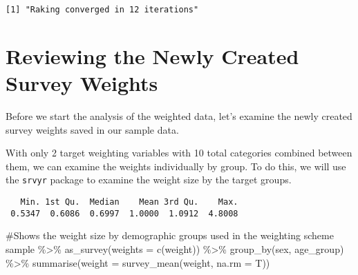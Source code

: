 \documentclass[
  letterpaper,
  DIV=11,
  numbers=noendperiod]{scrreprt}
\newenvironment{Shaded}{\begin{snugshade}}{\end{snugshade}}
\newcommand{\AttributeTok}[1]{\textcolor[rgb]{0.40,0.45,0.13}{#1}}
\newcommand{\CommentTok}[1]{\textcolor[rgb]{0.37,0.37,0.37}{#1}}
\newcommand{\DecValTok}[1]{\textcolor[rgb]{0.68,0.00,0.00}{#1}}
\newcommand{\FunctionTok}[1]{\textcolor[rgb]{0.28,0.35,0.67}{#1}}
\newcommand{\NormalTok}[1]{\textcolor[rgb]{0.00,0.23,0.31}{#1}}
\newcommand{\OtherTok}[1]{\textcolor[rgb]{0.00,0.23,0.31}{#1}}
\newcommand{\SpecialCharTok}[1]{\textcolor[rgb]{0.37,0.37,0.37}{#1}}
\begin{document}
\begin{verbatim}
[1] "Raking converged in 12 iterations"
\end{verbatim}

\begin{Shaded}
\end{Shaded}

\hypertarget{reviewing-the-newly-created-survey-weights}{%
\section{Reviewing the Newly Created Survey
Weights}\label{reviewing-the-newly-created-survey-weights}}

Before we start the analysis of the weighted data, let's examine the
newly created survey weights saved in our sample data.

With only 2 target weighting variables with 10 total categories combined
between them, we can examine the weights individually by group. To do
this, we will use the \texttt{srvyr} package to examine the weight size
by the target groups.

\begin{Shaded}
\end{Shaded}

\begin{verbatim}
   Min. 1st Qu.  Median    Mean 3rd Qu.    Max. 
 0.5347  0.6086  0.6997  1.0000  1.0912  4.8008 
\end{verbatim}

\begin{Shaded}
\begin{Highlighting}[]
\CommentTok{\#Shows the weight size by demographic groups used in the weighting scheme}
\NormalTok{sample }\SpecialCharTok{\%\textgreater{}\%} 
  \FunctionTok{as\_survey}\NormalTok{(}\AttributeTok{weights =} \FunctionTok{c}\NormalTok{(weight)) }\SpecialCharTok{\%\textgreater{}\%}
  \FunctionTok{group\_by}\NormalTok{(sex, age\_group) }\SpecialCharTok{\%\textgreater{}\%} 
  \FunctionTok{summarise}\NormalTok{(}\AttributeTok{weight =} \FunctionTok{survey\_mean}\NormalTok{(weight, }\AttributeTok{na.rm =}\NormalTok{ T))}
\end{Highlighting}
\end{Shaded}
\end{document}
